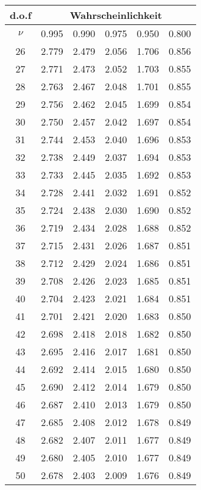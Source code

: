 \hspace{7mm}
\begin{tabular}{c||c|c|c|c|c|}
d.o.f & \multicolumn{5}{c|}{Wahrscheinlichkeit}\\
\hline
$\nu$ & 0.995 & 0.990 & 0.975 & 0.950 & 0.800 \\
\hline\hline
26 & 2.779 & 2.479 & 2.056 & 1.706 & 0.856 \\
\hline
27 & 2.771 & 2.473 & 2.052 & 1.703 & 0.855 \\
\hline
28 & 2.763 & 2.467 & 2.048 & 1.701 & 0.855 \\
\hline
29 & 2.756 & 2.462 & 2.045 & 1.699 & 0.854 \\
\hline
30 & 2.750 & 2.457 & 2.042 & 1.697 & 0.854 \\
\hline
31 & 2.744 & 2.453 & 2.040 & 1.696 & 0.853 \\
\hline
32 & 2.738 & 2.449 & 2.037 & 1.694 & 0.853 \\
\hline
33 & 2.733 & 2.445 & 2.035 & 1.692 & 0.853 \\
\hline
34 & 2.728 & 2.441 & 2.032 & 1.691 & 0.852 \\
\hline
35 & 2.724 & 2.438 & 2.030 & 1.690 & 0.852 \\
\hline
36 & 2.719 & 2.434 & 2.028 & 1.688 & 0.852 \\
\hline
37 & 2.715 & 2.431 & 2.026 & 1.687 & 0.851 \\
\hline
38 & 2.712 & 2.429 & 2.024 & 1.686 & 0.851 \\
\hline
39 & 2.708 & 2.426 & 2.023 & 1.685 & 0.851 \\
\hline
40 & 2.704 & 2.423 & 2.021 & 1.684 & 0.851 \\
\hline
41 & 2.701 & 2.421 & 2.020 & 1.683 & 0.850 \\
\hline
42 & 2.698 & 2.418 & 2.018 & 1.682 & 0.850 \\
\hline
43 & 2.695 & 2.416 & 2.017 & 1.681 & 0.850 \\
\hline
44 & 2.692 & 2.414 & 2.015 & 1.680 & 0.850 \\
\hline
45 & 2.690 & 2.412 & 2.014 & 1.679 & 0.850 \\
\hline
46 & 2.687 & 2.410 & 2.013 & 1.679 & 0.850 \\
\hline
47 & 2.685 & 2.408 & 2.012 & 1.678 & 0.849 \\
\hline
48 & 2.682 & 2.407 & 2.011 & 1.677 & 0.849 \\
\hline
49 & 2.680 & 2.405 & 2.010 & 1.677 & 0.849 \\
\hline
50 & 2.678 & 2.403 & 2.009 & 1.676 & 0.849 \\
\hline
\end{tabular}


